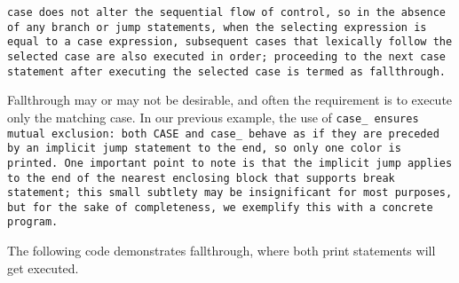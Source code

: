 \tt{case} does not alter the sequential flow of control,
so in the absence of any branch or jump statements,
when the selecting expression is equal to a \tt{case} expression,
subsequent cases that lexically follow the selected case are
also executed in order; proceeding to the next \tt{case} statement
after executing the selected case is termed as fallthrough.

Fallthrough may or may not be desirable,
and often the requirement is to execute only the matching case.
In our previous example, the use of \tt{case_} ensures mutual exclusion:
both \tt{CASE} and \tt{case_} behave as if they are preceded by an
implicit jump statement to the end, so only one color is printed.
One important point to note is that the implicit jump applies to the
end of the nearest enclosing block that supports \tt{break} statement;
this small subtlety may be insignificant for most purposes,
but for the sake of completeness, we exemplify this with a concrete program.

\example The following code demonstrates fallthrough,
where both print statements will get executed.


